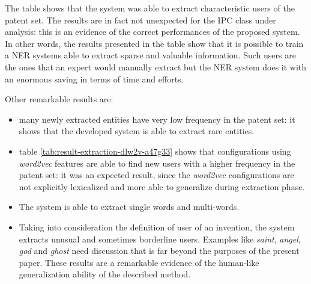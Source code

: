 \documentclass[]{book}
\begin{document}
The table shows that the system was able to extract characteristic users
of the patent set. The results are in fact not unexpected for the IPC
class under analysis: this is an evidence of the correct performances of
the proposed system. In other words, the results presented in the table
show that it is possible to train a NER systems able to extract sparse
and valuable information. Such users are the ones that an expert would
manually extract but the NER system does it with an enormous saving in
terms of time and efforts.

Other remarkable results are:

\begin{itemize}
\item
  many newly extracted entities have very low frequency in the patent
  set: it shows that the developed system is able to extract rare
  entities.
\item
  table \ref{tab:result-extraction-dlw2v-a47g33} shows that
  configurations using \emph{word2vec} features are able to find new
  users with a higher frequency in the patent set: it was an expected
  result, since the \emph{word2vec} configurations are not explicitly
  lexicalized and more able to generalize during extraction phase.
\item
  The system is able to extract single words and multi-words.
\item
  Taking into consideration the definition of user of an invention, the
  system extracts unusual and sometimes borderline users. Examples like
  \emph{saint}, \emph{angel}, \emph{god} and \emph{ghost} need
  discussion that is far beyond the purposes of the present paper. These
  results are a remarkable evidence of the human-like generalization
  ability of the described method.
\end{itemize}
\end{document}
